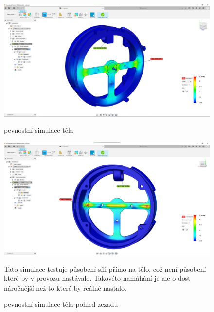 \begin{figure}[htbp]
    \centering
    \includegraphics[width=370pt]{kapitoly/obrazky/E4/machanika_tlakove_desky/simulace/F100N,primo,uprostred,pohled_zepredu.png}
    \caption{pevnostní simulace těla}
    \includegraphics[width=370pt]{kapitoly/obrazky/E4/machanika_tlakove_desky/simulace/F100N,primo,uprostred,pohled_zezadu.png}
    \caption{pevnostní simulace těla pohled zezadu}
    Tato simulace testuje působení síli přímo na tělo, což není působení které by v provozu nastávalo. Takovéto namáhání je ale o dost náročnější
    než to které by reálně nastalo.
    \label{fig:E4-simulace_tela}
\end{figure}

